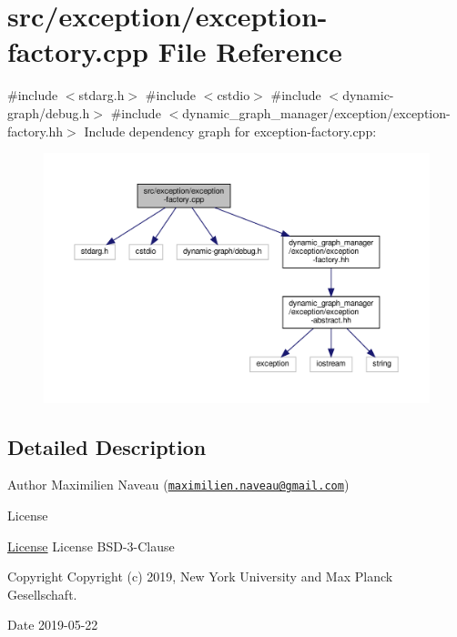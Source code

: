 \hypertarget{exception-factory_8cpp}{}\section{src/exception/exception-\/factory.cpp File Reference}
\label{exception-factory_8cpp}
{\ttfamily \#include $<$stdarg.\+h$>$}\newline
{\ttfamily \#include $<$cstdio$>$}\newline
{\ttfamily \#include $<$dynamic-\/graph/debug.\+h$>$}\newline
{\ttfamily \#include $<$dynamic\+\_\+graph\+\_\+manager/exception/exception-\/factory.\+hh$>$}\newline
Include dependency graph for exception-\/factory.cpp\+:
\nopagebreak
\begin{figure}[H]
\begin{center}
\leavevmode
\includegraphics[width=350pt]{exception-factory_8cpp__incl}
\end{center}
\end{figure}


\subsection{Detailed Description}
\begin{DoxyAuthor}{Author}
Maximilien Naveau (\href{mailto:maximilien.naveau@gmail.com}{\tt maximilien.\+naveau@gmail.\+com}) 
\end{DoxyAuthor}
\begin{DoxyRefDesc}{License}
\item[\hyperlink{license__license000046}{License}]License B\+S\+D-\/3-\/\+Clause \end{DoxyRefDesc}
\begin{DoxyCopyright}{Copyright}
Copyright (c) 2019, New York University and Max Planck Gesellschaft. 
\end{DoxyCopyright}
\begin{DoxyDate}{Date}
2019-\/05-\/22 
\end{DoxyDate}
